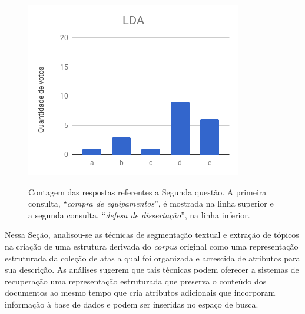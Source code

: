 \begin{figure}[!h]
{		\includegraphics[width=.31\textwidth]{conteudo/capitulos/figs/figuras-experimento/C2-Q2-LDA.png}
	}

	\caption{Contagem das respostas referentes a Segunda questão. A primeira consulta, ``\textit{compra de equipamentos}'', é mostrada na linha superior e a segunda consulta, ``\textit{defesa de dissertação}'', na linha inferior.}
	\label{fig:c12-q2}
\end{figure}











Nessa Seção, analisou-se as técnicas de segmentação textual e extração de tópicos na criação de uma estrutura derivada do \textit{corpus} original como uma representação estruturada da coleção de atas a qual foi organizada e acrescida de atributos para sua descrição. As análises sugerem que tais técnicas podem oferecer a sistemas de recuperação uma representação estruturada que preserva o conteúdo dos documentos ao mesmo tempo que cria atributos adicionais que incorporam informação à base de dados e podem ser inseridas no espaço de busca.  






